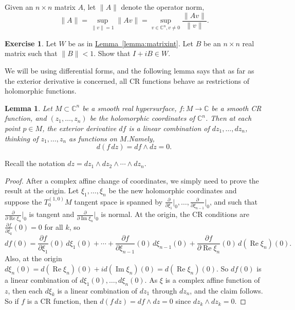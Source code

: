 \documentclass[12pt,openany]{book}
\renewcommand{\Re}{\operatorname{Re}}
\renewcommand{\Im}{\operatorname{Im}}
\newcommand{\snorm}[1]{\lVert {#1} \rVert}
\newcommand{\C}{{\mathbb{C}}}
\theoremstyle{plain}
\newtheorem{lemma}[thm]{Lemma}
\theoremstyle{remark}
\theoremstyle{definition}
\newenvironment{exbox}{%
    \def\FrameCommand{\vrule width 1pt \relax\hspace{10pt}}%
    \MakeFramed{\advance\hsize-\width\FrameRestore}%
}{%
    \endMakeFramed
}
\theoremstyle{exercise}
\newtheorem{exercise}{Exercise}[section]
\theoremstyle{example}
\newcommand{\lemmaref}[1]{\hyperref[#1]{Lemma~\ref*{#1}}}
\begin{document}
Given an $n \times n$ matrix $A$, let $\snorm{A}$ denote the operator norm,
\begin{equation*}
\snorm{A} = \sup_{\snorm{v}=1} \snorm{Av} = \sup_{v \in \C^n, v\not= 0}
\frac{\snorm{Av}}{\snorm{v}} .
\end{equation*}

\begin{exbox}
\begin{exercise}
Let $W$ be as in \lemmaref{lemma:matrixint}.  Let $B$ be an $n \times n$
real matrix such that $\snorm{B} < 1$.   Show that $I + iB \in W$.
\end{exercise}
\end{exbox}

We will be using differential forms, and the following lemma says
that as far as the exterior
derivative is concerned, all CR functions behave as
restrictions of holomorphic functions.

\begin{lemma} \label{lemma:crdf}
Let $M \subset \C^n$ be a smooth real hypersurface, $f \colon M \to \C$
be a smooth CR function, and $(z_1,\ldots,z_n)$ be the holomorphic
coordinates of $\C^n$.  Then at each point $p \in M$,
the exterior derivative
$df$ is a linear combination of $dz_1,\ldots,dz_n$,
thinking of $z_1,\ldots,z_n$ as functions on $M$.\linebreak[1]
Namely,
\begin{equation*}
d(f \, dz) = df \wedge dz = 0.
\end{equation*}
\end{lemma}

Recall the notation $dz = dz_1 \wedge dz_2 \wedge \cdots \wedge dz_n$.

\begin{proof}
After a complex affine change of coordinates, we simply
need to prove the result at the origin.  Let
$\xi_1,\ldots,\xi_n$ be
the new holomorphic coordinates
and suppose the $T^{(1,0)}_0 M$ tangent space is spanned
by
$\frac{\partial}{\partial \xi_1}\big|_0,
\ldots,
\frac{\partial}{\partial \xi_{n-1}}\big|_0$,
and such that $\frac{\partial}{\partial \Re \xi_n}\big|_0$ is tangent
and $\frac{\partial}{\partial \Im \xi_n}\big|_0$ is normal.
At the origin, the CR conditions are
$\frac{\partial f}{\partial \bar{\xi}_k}(0) = 0$ for all $k$, so
\begin{equation*}
df(0) =
\frac{\partial f}{\partial \xi_1}(0) \, d\xi_1(0) + \cdots +
\frac{\partial f}{\partial \xi_{n-1}}(0) \, d\xi_{n-1}(0)  +
\frac{\partial f}{\partial \Re \xi_{n}}(0) \, d(\Re \xi_{n})(0) 
.
\end{equation*}
Also, at the origin $d\xi_n(0) = d(\Re \xi_n)(0) + i d(\Im \xi_n)(0) = d(\Re \xi_n)(0)$.
So $df(0)$ is a linear combination of $d\xi_1(0),\ldots,d\xi_n(0)$.
As $\xi$ is a complex affine function of $z$, then each $d\xi_k$ is a linear
combination of $dz_1$ through $dz_n$, and the claim follows.
So if $f$ is a CR function, then
$d(f\,dz) = df \wedge dz = 0$ since $dz_k \wedge dz_k = 0$.
\end{proof}
\end{document}
